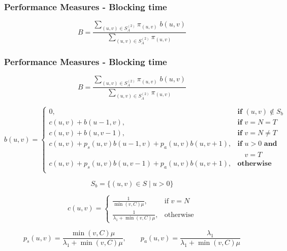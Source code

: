\begin{frame}
    \frametitle{Performance Measures - Blocking time}
    \centering
    \begin{equation*}
        B = \frac{\sum_{(u,v) \in S_A^{(2)}} \pi_{(u,v)} \; 
        b(u,v)}{\sum_{(u,v) \in S_A^{(2)}} \pi_{(u,v)}}
    \end{equation*}

\end{frame}


\begin{frame}
    \frametitle{Performance Measures - Blocking time}

    \scriptsize
    \begin{equation*}
        B = \frac{\sum_{(u,v) \in S_A^{(2)}} \pi_{(u,v)} \; 
        b(u,v)}{\sum_{(u,v) \in S_A^{(2)}} \pi_{(u,v)}}
    \end{equation*}

    \tiny
    \pause
    \begin{equation*}
        b(u,v) = 
        \begin{cases} 
            0, & \textbf{if } (u,v) \notin S_b \\
            c(u,v) + b(u - 1, v), & \textbf{if } v = N = T\\
            c(u,v) + b(u, v-1), & \textbf{if } v = N \neq T \\
            c(u,v) + p_s(u,v) b(u-1, v) + p_a(u,v) b(u, v+1), & \textbf{if } u > 0 
            \textbf{ and } \\ 
            & \quad v = T \\
            c(u,v) + p_s(u,v) b(u, v-1) + p_a(u,v) b(u, v+1), & \textbf{otherwise} \\
        \end{cases}
    \end{equation*}
    
    \pause
    \begin{equation*}
        S_b = \{(u,v) \in S \; | \; u > 0\}
    \end{equation*}
        
    \pause
    \begin{equation*}
        c(u,v) = 
        \begin{cases}
            \frac{1}{\min(v,C) \mu}, & \text{if } v = N\\
            \frac{1}{\lambda_1 + \min(v,C) \mu}, & \text{otherwise}
        \end{cases}
    \end{equation*}
    
    \pause
    \begin{equation*}
        p_s(u,v) = \frac{\min(v,C)\mu}{\lambda_1 + \min(v,C)\mu}, \qquad
        p_a(u,v) = \frac{\lambda_1}{\lambda_1 + \min(v,C)\mu}
    \end{equation*}
    
\end{frame}



